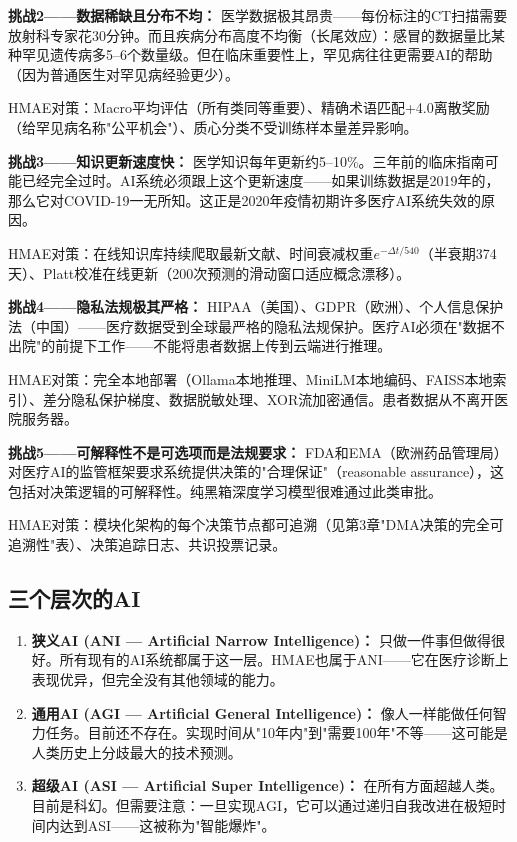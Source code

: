 \documentclass[11pt,a4paper]{ctexart}
\begin{document}
\textbf{挑战2——数据稀缺且分布不均：}
医学数据极其昂贵——每份标注的CT扫描需要放射科专家花30分钟。而且疾病分布高度不均衡（长尾效应）：感冒的数据量比某种罕见遗传病多5--6个数量级。但在临床重要性上，罕见病往往更需要AI的帮助（因为普通医生对罕见病经验更少）。

HMAE对策：Macro平均评估（所有类同等重要）、精确术语匹配+4.0离散奖励（给罕见病名称"公平机会"）、质心分类不受训练样本量差异影响。

\textbf{挑战3——知识更新速度快：}
医学知识每年更新约5--10\%。三年前的临床指南可能已经完全过时。AI系统必须跟上这个更新速度——如果训练数据是2019年的，那么它对COVID-19一无所知。这正是2020年疫情初期许多医疗AI系统失效的原因。

HMAE对策：在线知识库持续爬取最新文献、时间衰减权重$e^{-\Delta t/540}$（半衰期374天）、Platt校准在线更新（200次预测的滑动窗口适应概念漂移）。

\textbf{挑战4——隐私法规极其严格：}
HIPAA（美国）、GDPR（欧洲）、个人信息保护法（中国）——医疗数据受到全球最严格的隐私法规保护。医疗AI必须在"数据不出院"的前提下工作——不能将患者数据上传到云端进行推理。

HMAE对策：完全本地部署（Ollama本地推理、MiniLM本地编码、FAISS本地索引）、差分隐私保护梯度、数据脱敏处理、XOR流加密通信。患者数据从不离开医院服务器。

\textbf{挑战5——可解释性不是可选项而是法规要求：}
FDA和EMA（欧洲药品管理局）对医疗AI的监管框架要求系统提供决策的"合理保证"（reasonable assurance），这包括对决策逻辑的可解释性。纯黑箱深度学习模型很难通过此类审批。

HMAE对策：模块化架构的每个决策节点都可追溯（见第3章"DMA决策的完全可追溯性"表）、决策追踪日志、共识投票记录。



\subsection{三个层次的AI}

\begin{enumerate}[nosep]
\item \textbf{狭义AI (ANI — Artificial Narrow Intelligence)：} 只做一件事但做得很好。所有现有的AI系统都属于这一层。HMAE也属于ANI——它在医疗诊断上表现优异，但完全没有其他领域的能力。
\item \textbf{通用AI (AGI — Artificial General Intelligence)：} 像人一样能做任何智力任务。目前还不存在。实现时间从"10年内"到"需要100年"不等——这可能是人类历史上分歧最大的技术预测。
\item \textbf{超级AI (ASI — Artificial Super Intelligence)：} 在所有方面超越人类。目前是科幻。但需要注意：一旦实现AGI，它可以通过递归自我改进在极短时间内达到ASI——这被称为"智能爆炸"。
\end{enumerate}
\end{document}
